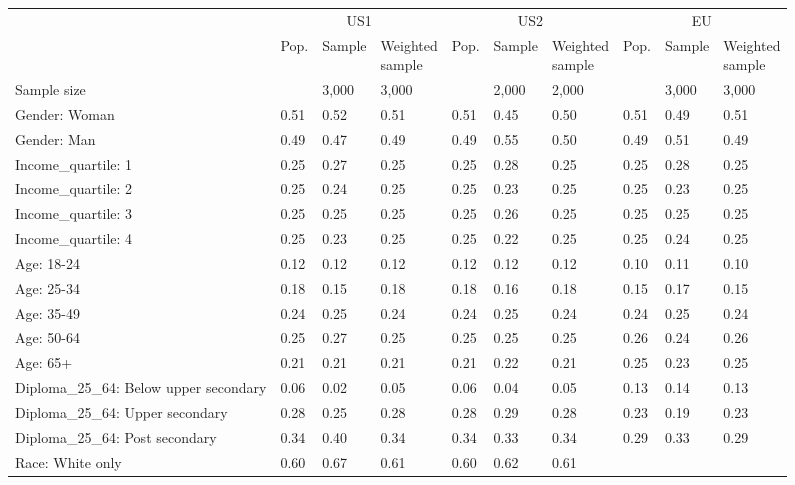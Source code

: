 
\begin{tabular}[t]{llllllllll}
\toprule
\multicolumn{1}{c}{} & \multicolumn{3}{c}{US1} & \multicolumn{3}{c}{US2} & \multicolumn{3}{c}{EU} \\
\cmidrule(l{3pt}r{3pt}){2-4} \cmidrule(l{3pt}r{3pt}){5-7} \cmidrule(l{3pt}r{3pt}){8-10}
  & Pop. & Sample & \makecell{Weighted\\sample} & Pop. & Sample & \makecell{Weighted\\sample} & Pop. & Sample & \makecell{Weighted\\sample}\\
\midrule
Sample size &  & 3,000 & 3,000 &  & 2,000 & 2,000 &  & 3,000 & 3,000\\
\addlinespace
Gender: Woman & 0.51 & 0.52 & 0.51 & 0.51 & 0.45 & 0.50 & 0.51 & 0.49 & 0.51\\
Gender: Man & 0.49 & 0.47 & 0.49 & 0.49 & 0.55 & 0.50 & 0.49 & 0.51 & 0.49\\
\addlinespace
Income\_quartile: 1 & 0.25 & 0.27 & 0.25 & 0.25 & 0.28 & 0.25 & 0.25 & 0.28 & 0.25\\
Income\_quartile: 2 & 0.25 & 0.24 & 0.25 & 0.25 & 0.23 & 0.25 & 0.25 & 0.23 & 0.25\\
Income\_quartile: 3 & 0.25 & 0.25 & 0.25 & 0.25 & 0.26 & 0.25 & 0.25 & 0.25 & 0.25\\
Income\_quartile: 4 & 0.25 & 0.23 & 0.25 & 0.25 & 0.22 & 0.25 & 0.25 & 0.24 & 0.25\\
\addlinespace
Age: 18-24 & 0.12 & 0.12 & 0.12 & 0.12 & 0.12 & 0.12 & 0.10 & 0.11 & 0.10\\
Age: 25-34 & 0.18 & 0.15 & 0.18 & 0.18 & 0.16 & 0.18 & 0.15 & 0.17 & 0.15\\
Age: 35-49 & 0.24 & 0.25 & 0.24 & 0.24 & 0.25 & 0.24 & 0.24 & 0.25 & 0.24\\
Age: 50-64 & 0.25 & 0.27 & 0.25 & 0.25 & 0.25 & 0.25 & 0.26 & 0.24 & 0.26\\
Age: 65+ & 0.21 & 0.21 & 0.21 & 0.21 & 0.22 & 0.21 & 0.25 & 0.23 & 0.25\\
\addlinespace
Diploma\_25\_64: Below upper secondary & 0.06 & 0.02 & 0.05 & 0.06 & 0.04 & 0.05 & 0.13 & 0.14 & 0.13\\
Diploma\_25\_64: Upper secondary & 0.28 & 0.25 & 0.28 & 0.28 & 0.29 & 0.28 & 0.23 & 0.19 & 0.23\\
Diploma\_25\_64: Post secondary & 0.34 & 0.40 & 0.34 & 0.34 & 0.33 & 0.34 & 0.29 & 0.33 & 0.29\\
\addlinespace
Race: White only & 0.60 & 0.67 & 0.61 & 0.60 & 0.62 & 0.61 &  &  & \\

\end{tabular}
